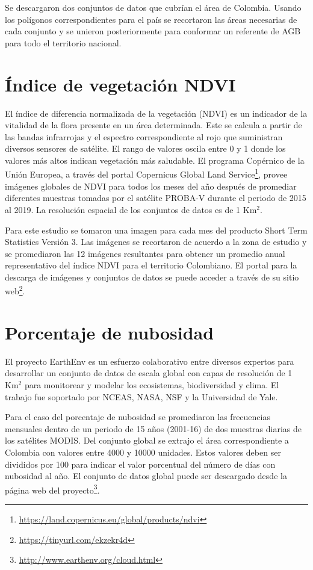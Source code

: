Se descargaron dos conjuntos de datos que cubrían el área de Colombia.  Usando los polígonos correspondientes para el país se recortaron las áreas necesarias de 
cada conjunto y se unieron posteriormente para conformar un referente de AGB para todo el territorio nacional.

\section{Índice de vegetación NDVI}

El índice de diferencia normalizada de la vegetación (NDVI) es un indicador de la vitalidad de la flora presente en un área determinada.  Este se calcula a 
partir de las bandas infrarrojas y el espectro correspondiente al rojo que suministran diversos sensores de satélite.  El rango de valores oscila entre 0 y 1 
donde los valores más altos indican vegetación más saludable.  El programa Copérnico de la Unión Europea, a través del portal Copernicus Global Land 
Service\footnote{\url{https://land.copernicus.eu/global/products/ndvi}}, provee imágenes globales de NDVI para todos los meses del año después de promediar 
diferentes muestras tomadas por el satélite PROBA-V durante el periodo de 2015 al 2019.  La resolución espacial de los conjuntos de datos es de 1 Km$^2$. 

Para este estudio se tomaron una imagen para cada mes del producto Short Term Statistics Versión 3.  Las imágenes se recortaron de acuerdo a la zona de estudio 
 y se promediaron las 12 imágenes resultantes para obtener un promedio anual representativo del índice NDVI para el territorio Colombiano.  El portal para la 
descarga de imágenes y conjuntos de datos se puede acceder a través de su sitio web\footnote{\url{ https://tinyurl.com/ekzekr4d}}.

\section{Porcentaje de nubosidad}

El proyecto EarthEnv \cite{wilson_remotely_2016}  es un esfuerzo colaborativo entre diversos expertos para desarrollar un conjunto de datos de escala global con 
capas de resolución de 1 Km$^2$ para monitorear y modelar los ecosistemas, biodiversidad y clima.  El trabajo fue soportado por NCEAS, NASA, NSF y la 
Universidad de Yale.  

Para el caso del porcentaje de nubosidad se promediaron las frecuencias mensuales dentro de un periodo de 15 años (2001-16) de dos muestras diarias de los 
satélites MODIS.  Del conjunto global se extrajo el área correspondiente a Colombia con valores entre 4000 y 10000 unidades.  Estos valores deben ser divididos 
por 100 para indicar el valor porcentual del número de días con nubosidad al año.  El conjunto de datos global puede ser descargado desde la página web del 
proyecto\footnote{\url{http://www.earthenv.org/cloud.html}}.

